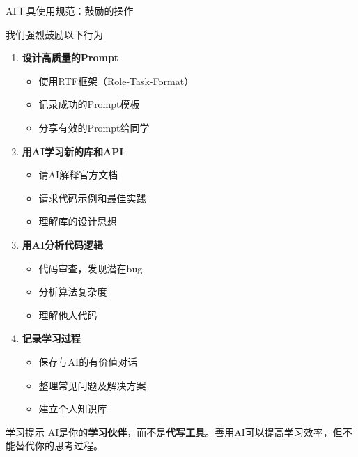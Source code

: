 \begin{frame}{AI工具使用规范：鼓励的操作}
	\begin{exampleblock}{我们强烈鼓励以下行为}
		\begin{enumerate}
			\item \textbf{设计高质量的Prompt}
			      \begin{itemize}
				      \item 使用RTF框架（Role-Task-Format）
				      \item 记录成功的Prompt模板
				      \item 分享有效的Prompt给同学
			      \end{itemize}

			\item \textbf{用AI学习新的库和API}
			      \begin{itemize}
				      \item 请AI解释官方文档
				      \item 请求代码示例和最佳实践
				      \item 理解库的设计思想
			      \end{itemize}

			\item \textbf{用AI分析代码逻辑}
			      \begin{itemize}
				      \item 代码审查，发现潜在bug
				      \item 分析算法复杂度
				      \item 理解他人代码
			      \end{itemize}

			\item \textbf{记录学习过程}
			      \begin{itemize}
				      \item 保存与AI的有价值对话
				      \item 整理常见问题及解决方案
				      \item 建立个人知识库
			      \end{itemize}
		\end{enumerate}
	\end{exampleblock}

	\vspace{0.3cm}

	\begin{block}{学习提示}
		AI是你的\textbf{学习伙伴}，而不是\textbf{代写工具}。善用AI可以提高学习效率，但不能替代你的思考过程。
	\end{block}
\end{frame}

